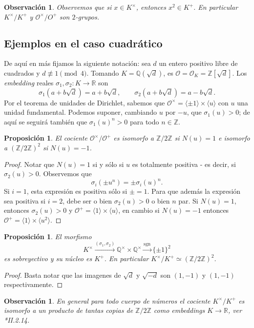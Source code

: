 \documentclass[11pt,a4paper]{amsart}
\newcommand{\R}{\mathbb{R}}
\newcommand{\Q}{\mathbb{Q}}
\newcommand{\Z}{\mathbb{Z}}
\newcommand{\xto}{\xrightarrow}
\numberwithin{equation}{section}
\theoremstyle{plain}
\newtheorem{prop}[equation]{Proposición}
\newtheorem{obs}[equation]{Observación}
\renewcommand{\O}{\mathcal{O}}
\begin{document}
\begin{obs} Observemos que si $x \in K^\times$, entonces $x^2 \in K^+$.
En particular $K^\times/K^+$ y $\O^\times/O^+$ son $2$-grupos.
\end{obs}

\subsection{Ejemplos en el caso cuadrático} De aquí en más fijamos
la siguiente notación: sea $d$ un entero positivo
libre de cuadrados y
$d \not \equiv 1 \pmod{4}$. Tomando $K = \Q(\sqrt{d})$, es $\O = \O_K =
\Z[\sqrt{d}]$. Los \textit{embedding} reales $\sigma_1, \sigma_2 \colon K
\to \R$ son
\[
\sigma_1(a+b\sqrt{d}) = a+b\sqrt{d}, \qquad
\sigma_2(a+b\sqrt{d}) = a-b\sqrt{d}.
\]
Por el teorema de unidades de Dirichlet, sabemos que $\mathcal O^\times
= \langle\pm 1\rangle \times \langle u \rangle$ con $u$ una unidad
fundamental. Podemos suponer, cambiando $u$ por $-u$, que $\sigma_1(u) > 0$;
de aquí se seguirá también que $\sigma_1(u)^n > 0$ para todo $n \in \Z$.


\begin{prop} El cociente $\O^\times/\O^+$ es isomorfo a $\Z/2\Z$
si $N(u) = 1$ e isomorfo a $(\Z/2\Z)^2$ si $N(u) = -1$.
\end{prop}
\begin{proof}
Notar que $N(u) = 1$ si y sólo si $u$ es totalmente positiva
- es decir, si $\sigma_2(u)>0$. Observemos que
\[
\sigma_i(\pm u^n) = \pm \sigma_i(u)^n.
\]
Si $i = 1$, esta expresión es positiva sólo si $\pm = 1$. Para que además
la expresión sea positiva si $i = 2$, debe ser o bien $\sigma_2(u) > 0$
o bien $n$ par. Si $N(u) = 1$, entonces $\sigma_2(u) > 0$ y $\O^+
= \langle 1 \rangle \times \langle u \rangle$, en cambio si $N(u) = -1$
entonces $\O^+ = \langle 1 \rangle \times \langle u^2 \rangle$.
\end{proof}

\begin{prop} El morfismo
\[
K^\times \xto{(\sigma_1,\sigma_2)}
\Q^\times \times \Q^\times \xto{\mathrm{sgn}} \{\pm 1\}^2
\]
es sobreyectivo y su núcleo es $K^+$.
En particular $K^\times/K^+ \simeq (\Z/2\Z)^2$.
\end{prop}
\begin{proof} Basta notar que las imagenes de $\sqrt{d}$ y $\sqrt{-d}$
son $(1,-1)$ y $(1,-1)$ respectivamente.
\end{proof}

\begin{obs} En general para todo cuerpo de números
el cociente $K^\times / K^+$ es isomorfo a un producto
de tantas copias de $\Z/2\Z$ como embeddings $K \to \R$,
ver \cite{ft}*{II.2.14}.
\end{obs}
\end{document}
